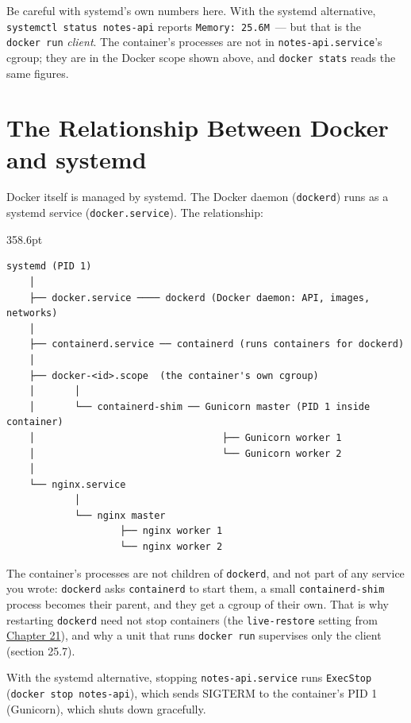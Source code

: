 \noindent{}Be careful with systemd's own numbers here. With the systemd alternative, \texttt{systemctl\ status\ notes-}\allowbreak{}\texttt{api} reports \texttt{Memory:\ 25.6M}~--- but that is the \texttt{docker\ run} \emph{client}. The container's processes are not in \texttt{notes-api.service}'s cgroup; they are in the Docker scope shown above, and \texttt{docker\ stats} reads the same figures.

\setcounter{section}{7}
\section{The Relationship Between Docker and systemd}\label{25-process-management:258-the-relationship-between-docker-and-systemd}

Docker itself is managed by systemd. The Docker daemon (\texttt{dockerd}) runs as a systemd service (\texttt{docker.service}). The relationship:

\begin{diagrambox}[short]{358.6pt}
\begin{Verbatim}[fontsize=\fontsize{9.0}{8.55}\selectfont]
systemd (PID 1)
    │
    ├── docker.service ──── dockerd (Docker daemon: API, images, networks)
    │
    ├── containerd.service ── containerd (runs containers for dockerd)
    │
    ├── docker-<id>.scope  (the container's own cgroup)
    │       │
    │       └── containerd-shim ── Gunicorn master (PID 1 inside container)
    │                                 ├── Gunicorn worker 1
    │                                 └── Gunicorn worker 2
    │
    └── nginx.service
            │
            └── nginx master
                    ├── nginx worker 1
                    └── nginx worker 2
\end{Verbatim}
\end{diagrambox}

\noindent{}The container's processes are not children of \texttt{dockerd}, and not part of any service you wrote: \texttt{dockerd} asks \texttt{containerd} to start them, a small \texttt{containerd-shim} process becomes their parent, and they get a cgroup of their own. That is why restarting \texttt{dockerd} need not stop containers (the \texttt{live-restore} setting from \hyperref[ch:21-system-setup]{Chapter 21}), and why a unit that runs \texttt{docker\ run} supervises only the client (section 25.7).

With the systemd alternative, stopping \texttt{notes-api.service} runs \texttt{ExecStop} (\texttt{docker\ stop\ notes-api}), which sends SIGTERM to the container's PID 1 (Gunicorn), which shuts down gracefully.

